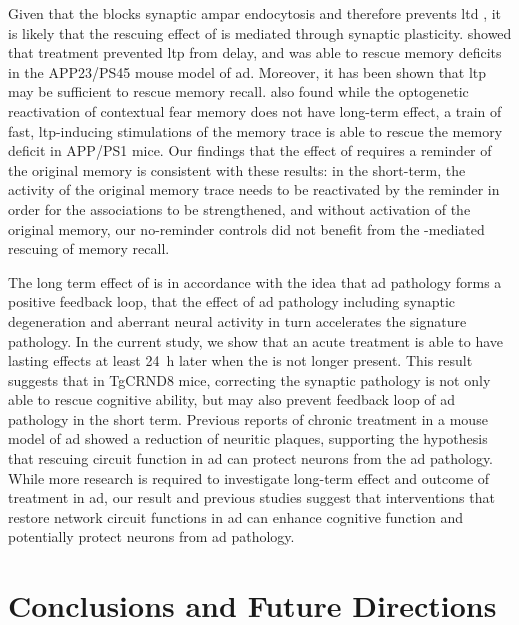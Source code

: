 Given that the \tglu{} blocks synaptic \gls{ampar} endocytosis and therefore prevents \gls{ltd} \citep{ahmadian04}, it is likely that the rescuing effect of \tglu{} is mediated through synaptic plasticity. \citet{dong15} showed that \tglu{} treatment prevented \gls{ltp} from delay, and was able to rescue memory deficits in the APP23/PS45 mouse model of \gls{ad}. Moreover, it has been shown that \gls{ltp} may be sufficient to rescue memory recall. \citet{roy16} also found while the optogenetic reactivation of contextual fear memory does not have long-term effect, a train of fast, \gls{ltp}-inducing stimulations of the memory trace is able to rescue the memory deficit in APP/PS1 mice. Our findings that the effect of \tglu{} requires a reminder of the original memory is consistent with these results: in the short-term, the activity of the original memory trace needs to be reactivated by the reminder in order for the associations to be strengthened, and without activation of the original memory, our no-reminder controls did not benefit from the \tglu{}-mediated rescuing of memory recall.

The long term effect of \tglu{} is in accordance with the idea that \gls{ad} pathology forms a positive feedback loop, that the effect of \gls{ad} pathology including synaptic degeneration and aberrant neural activity in turn accelerates the signature pathology. In the current study, we show that an acute \tglu{} treatment is able to have lasting effects at least \SI{24}{\hour} later when the \tglu{} is not longer present. This result suggests that in TgCRND8 mice, correcting the synaptic pathology is not only able to rescue cognitive ability, but may also prevent feedback loop of \gls{ad} pathology in the short term. Previous reports of chronic \tglu{} treatment in a mouse model of \gls{ad} showed a reduction of neuritic plaques, supporting the hypothesis that rescuing circuit function in \gls{ad} can protect neurons from the \gls{ad} pathology. While more research is required to investigate long-term effect and outcome of \tglu{} treatment in \gls{ad}, our result and previous studies \citep{roy16, migues16, dong15} suggest that interventions that restore network circuit functions in \gls{ad} can enhance cognitive function and potentially protect neurons from \gls{ad} pathology. 

\chapter{Conclusions and Future Directions}

